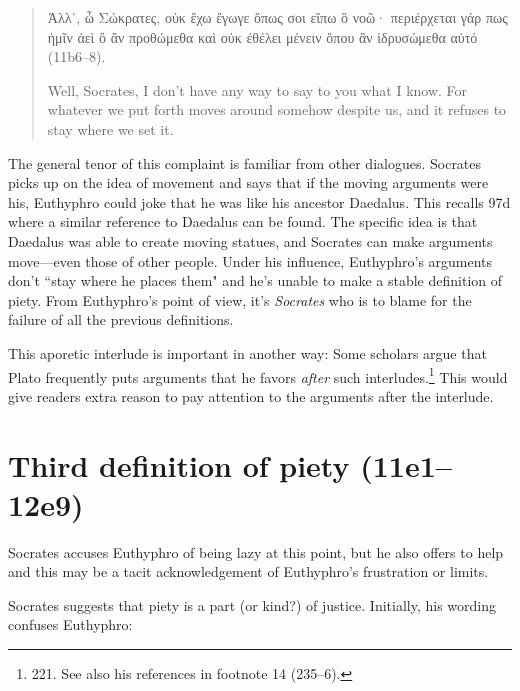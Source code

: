 \documentclass[11pt]{article}
\begin{document}
\begin{quote}

    {\g
    Ἀλλ᾽, ὦ Σώκρατες, οὐκ ἔχω ἔγωγε ὅπως σοι εἴπω ὃ νοῶ· περιέρχεται γάρ
    πως ἡμῖν ἀεὶ ὃ ἂν προθώμεθα καὶ οὐκ ἐθέλει μένειν ὅπου ἂν ἱδρυσώμεθα
    αὐτό
    } (11b6--8).

    Well, Socrates, I don't have any way to say to you what I know. For
    whatever we put forth moves around somehow despite us, and it refuses
    to stay where we set it.

\end{quote}

The general tenor of this complaint is familiar from other dialogues.
Socrates picks up on the idea of movement and says that if the moving
arguments were his, Euthyphro could joke that he was like his ancestor
Daedalus.  This recalls  97d where a similar reference to
Daedalus can be found.  The specific idea is that Daedalus was able to
create moving statues, and Socrates can make arguments move---even those
of other people.  Under his influence, Euthyphro's arguments don't ``stay
where he places them" and he's unable to make a stable definition of piety.
From Euthyphro's point of view, it's \emph{Socrates} who is to blame for
the failure of all the previous definitions.

This aporetic interlude is important in another way: Some scholars argue
that Plato frequently puts arguments that he favors \emph{after} such
interludes.\footnote{\citet{mcpherran1992} 221.  See also his references in
footnote 14 (235--6).}  This would give readers extra reason to pay
attention to the arguments after the interlude.


\section{Third definition of piety (11e1--12e9)}

Socrates accuses Euthyphro of being lazy at this point, but he also offers
to help and this may be a tacit acknowledgement of Euthyphro's frustration
or limits.

Socrates suggests that piety is a part (or kind?) of justice. Initially,
his wording confuses Euthyphro:
\end{document}
